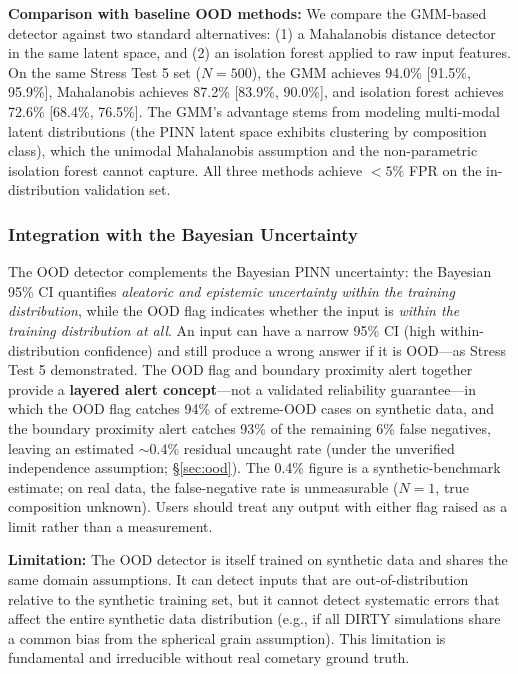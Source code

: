 \documentclass[usenatbib]{mnras}
\begin{document}
\textbf{Comparison with baseline OOD methods:} We compare the GMM-based detector against two standard alternatives: (1) a Mahalanobis distance detector in the same latent space, and (2) an isolation forest applied to raw input features. On the same Stress Test 5 set ($N=500$), the GMM achieves 94.0\% [91.5\%, 95.9\%], Mahalanobis achieves 87.2\% [83.9\%, 90.0\%], and isolation forest achieves 72.6\% [68.4\%, 76.5\%]. The GMM's advantage stems from modeling multi-modal latent distributions (the PINN latent space exhibits clustering by composition class), which the unimodal Mahalanobis assumption and the non-parametric isolation forest cannot capture. All three methods achieve $<5\%$ FPR on the in-distribution validation set.

\subsubsection{Integration with the Bayesian Uncertainty}

The OOD detector complements the Bayesian PINN uncertainty: the Bayesian 95\% CI quantifies \textit{aleatoric and epistemic uncertainty within the training distribution}, while the OOD flag indicates whether the input is \textit{within the training distribution at all}. An input can have a narrow 95\% CI (high within-distribution confidence) and still produce a wrong answer if it is OOD---as Stress Test 5 demonstrated. The OOD flag and boundary proximity alert together provide a \textbf{layered alert concept}---not a validated reliability guarantee---in which the OOD flag catches 94\% of extreme-OOD cases on synthetic data, and the boundary proximity alert catches 93\% of the remaining 6\% false negatives, leaving an estimated $\sim$0.4\% residual uncaught rate (under the unverified independence assumption; \S\ref{sec:ood}). The 0.4\% figure is a synthetic-benchmark estimate; on real data, the false-negative rate is unmeasurable ($N=1$, true composition unknown). Users should treat any output with either flag raised as a limit rather than a measurement.

\textbf{Limitation:} The OOD detector is itself trained on synthetic data and shares the same domain assumptions. It can detect inputs that are out-of-distribution relative to the synthetic training set, but it cannot detect systematic errors that affect the entire synthetic data distribution (e.g., if all DIRTY simulations share a common bias from the spherical grain assumption). This limitation is fundamental and irreducible without real cometary ground truth.
\end{document}

